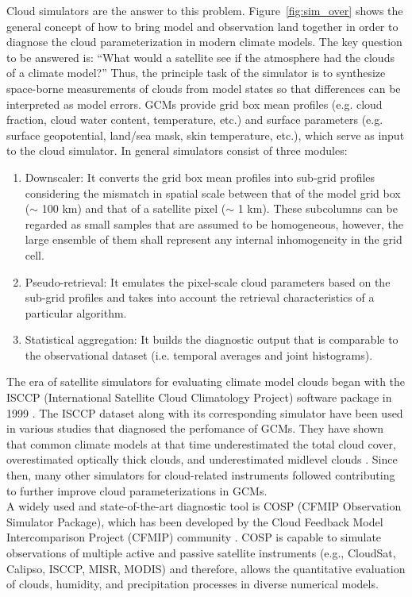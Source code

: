 Cloud simulators are the answer to this problem. 
Figure~\ref{fig:sim_over} shows the general concept of how to bring model and observation land 
together in order to diagnose the cloud parameterization in modern climate models.
The key question to be answered is: 
``What would a satellite see if the atmosphere had the clouds of a climate model?'' 
Thus, the principle task of the simulator is to synthesize space-borne measurements of clouds 
from model states so that differences can be interpreted as model errors.
GCMs provide grid box mean profiles (e.g. cloud fraction, cloud water content, temperature, etc.)
and surface parameters (e.g. surface geopotential, land/sea mask, skin temperature, etc.),
which serve as input to the cloud simulator.
In general simulators consist of three modules:
\begin{enumerate}\setlength\itemsep{0.2em}
 \item Downscaler: It converts the grid box mean profiles into sub-grid profiles considering
 the mismatch in spatial scale between that of the model grid box ($\sim$ 100 km) and 
 that of a satellite pixel ($\sim$ 1 km). These subcolumns can be regarded as small samples that
 are assumed to be homogeneous, however, the large ensemble of them shall represent any 
 internal inhomogeneity in the grid cell.
 \item Pseudo-retrieval: It emulates the pixel-scale cloud parameters based on the sub-grid profiles
 and takes into account the retrieval characteristics of a particular algorithm.
 \item Statistical aggregation: It builds the diagnostic output that is comparable to the 
 observational dataset (i.e. temporal averages and joint histograms).
\end{enumerate}

The era of satellite simulators for evaluating climate model clouds began with the 
ISCCP (International Satellite Cloud Climatology Project) software package in 1999 \cite{Klein1999}.
The ISCCP dataset \cite{Rossow1999} along with its corresponding simulator have been used
in various studies that diagnosed the perfomance of GCMs. They have shown that common climate models
at that time underestimated the total cloud cover, overestimated optically thick clouds, and
underestimated midlevel clouds \cite{Kay2012}. 
Since then, many other simulators for cloud-related instruments \cite{Pincus2012} 
followed contributing to further improve cloud parameterizations in GCMs.\\
A widely used and state-of-the-art diagnostic tool is COSP (CFMIP Observation Simulator Package), 
which has been developed by the Cloud Feedback Model Intercomparison Project (CFMIP) community \cite{Bodas2011}.
COSP is capable to simulate observations of multiple active and passive satellite instruments
(e.g., CloudSat, Calipso, ISCCP, MISR, MODIS) and therefore, allows the quantitative evaluation of 
clouds, humidity, and precipitation processes in diverse numerical models.

